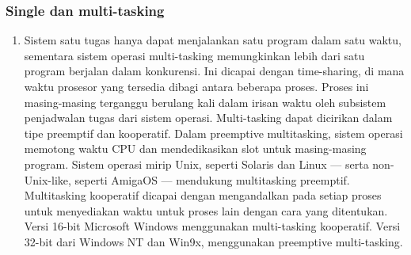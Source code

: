 \subsubsection{Single dan multi-tasking}
\begin{enumerate}
\item Sistem satu tugas hanya dapat menjalankan satu program dalam satu waktu, sementara sistem operasi multi-tasking memungkinkan lebih dari satu program berjalan dalam konkurensi. Ini dicapai dengan time-sharing, di mana waktu prosesor yang tersedia dibagi antara beberapa proses. Proses ini masing-masing terganggu berulang kali dalam irisan waktu oleh subsistem penjadwalan tugas dari sistem operasi. Multi-tasking dapat dicirikan dalam tipe preemptif dan kooperatif. Dalam preemptive multitasking, sistem operasi memotong waktu CPU dan mendedikasikan slot untuk masing-masing program. Sistem operasi mirip Unix, seperti Solaris dan Linux — serta non-Unix-like, seperti AmigaOS — mendukung multitasking preemptif. Multitasking kooperatif dicapai dengan mengandalkan pada setiap proses untuk menyediakan waktu untuk proses lain dengan cara yang ditentukan. Versi 16-bit Microsoft Windows menggunakan multi-tasking kooperatif. Versi 32-bit dari Windows NT dan Win9x, menggunakan preemptive multi-tasking.
\end{enumerate}
